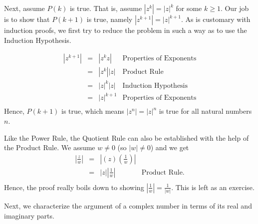 \documentclass{ximera}
\begin{document}
   
  
 Next, assume $P(k)$ is true.  That is, assume $\left|z^{k}\right| = |z|^k$ for some $k \geq 1$.    Our job is to show that $P(k+1)$ is true, namely $\left|z^{k+1}\right| = |z|^{k+1}$.  As is customary with induction proofs, we first try to reduce the problem in such a way as to  use the Induction Hypothesis.

\[\begin{array}{rcll}
\left|z^{k+1}\right| & = & \left|z^{k} z\right| & \text{Properties of Exponents} \\
& = & \left|z^{k}\right| |z| & \text{Product Rule} \\
& = &  |z|^{k} |z| & \text{Induction Hypothesis} \\
& = &  |z|^{k+1} & \text{Properties of Exponents} \\ \end{array} \]
Hence, $P(k+1)$ is true, which means $\left|z^{n}\right| = |z|^{n}$ is true for all natural numbers $n$.  

 

Like the Power Rule, the Quotient Rule can also be established with the help of the Product Rule. We assume $w \neq 0$ (so $|w| \neq 0$) and we get
\[ \begin{array}{rcll}

\left| \frac{z}{w} \right| &  = & \left| (z) \left( \frac{1}{w} \right) \right| & \\
	 & = & |z| \left| \frac{1}{w}\right| & \text{Product Rule.} \\ \end{array} \]
Hence, the proof really boils down to showing $\left| \frac{1}{w} \right| = \frac{1}{|w|}$.  This is left as an exercise.

 

Next, we characterize the argument of a complex number in terms of its real and imaginary parts.

 

\end{document}
